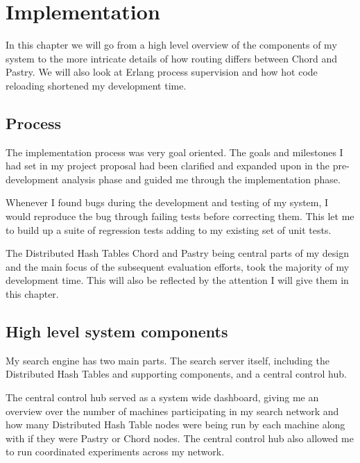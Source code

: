 

\section{Implementation}
In this chapter we will go from a high level overview of the components of my system to the more intricate details of how routing differs between Chord and Pastry.
We will also look at Erlang process supervision and how hot code reloading shortened my development time.

\subsection{Process}
The implementation process was very goal oriented. The goals and milestones I had set in my project proposal had been clarified and expanded upon in the pre-development analysis phase and guided me through the implementation phase.

Whenever I found bugs during the development and testing of my system, I would reproduce the bug through failing tests before correcting them. This let me to build up a suite of regression tests adding to my existing set of unit tests.

The Distributed Hash Tables Chord and Pastry being central parts of my design and the main focus of the subsequent evaluation efforts, took the majority of my development time. This will also be reflected by the attention I will give them in this chapter.


\subsection{High level system components}
My search engine has two main parts. The search server itself, including the Distributed Hash Tables and supporting components, and a central control hub.

The central control hub served as a system wide dashboard, giving me an overview over the number of machines participating in my search network and how many Distributed Hash Table nodes were being run by each machine along with if they were Pastry or Chord nodes. The central control hub also allowed me to run coordinated experiments across my network.

